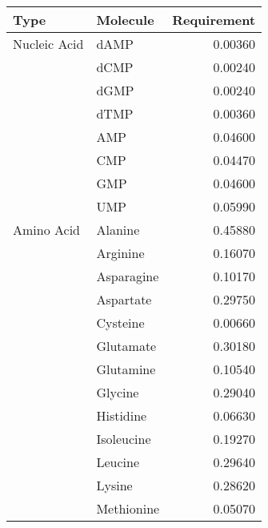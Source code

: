 \begin{table}
  \centering
  \begin{footnotesize}
  \begin{tabular}{l l r}
                                                                     \toprule
    Type           & Molecule                       & Requirement \\ \midrule
    Nucleic Acid   & dAMP                           &  0.00360    \\
                   & dCMP                           &  0.00240    \\
                   & dGMP                           &  0.00240    \\
                   & dTMP                           &  0.00360    \\
                   & AMP                            &  0.04600    \\
                   & CMP                            &  0.04470    \\
                   & GMP                            &  0.04600    \\
                   & UMP                            &  0.05990    \\ \midrule
      Amino Acid   & Alanine                        &  0.45880    \\
                   & Arginine                       &  0.16070    \\
                   & Asparagine                     &  0.10170    \\
                   & Aspartate                      &  0.29750    \\
                   & Cysteine                       &  0.00660    \\
                   & Glutamate                      &  0.30180    \\
                   & Glutamine                      &  0.10540    \\
                   & Glycine                        &  0.29040    \\
                   & Histidine                      &  0.06630    \\
                   & Isoleucine                     &  0.19270    \\
                   & Leucine                        &  0.29640    \\
                   & Lysine                         &  0.28620    \\
                   & Methionine                     &  0.05070    \\

\end{tabular}
\end{footnotesize}
\end{table}
